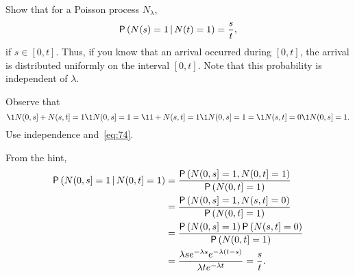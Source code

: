 \begin{extra}
Show that for a Poisson process $N_\lambda$, 
\begin{equation*}
\P{N(s) =1\given N(t)=1} = \frac s t,
\end{equation*}
if $s\in[0,t]$. Thus, if you know that an arrival occurred during $[0,t]$, the arrival is distributed
uniformly on the interval $[0,t]$. Note that this probability is independent of $\lambda$. 
\begin{hint}
 Observe that 
 \begin{equation*}
\1{N(0,s]+N(s,t]=1}\1{N(0,s]=1} = \1{1+N(s,t]=1}\1{N(0,s]=1}=\1{N(s,t]=0}\1{N(0,s]=1}.
 \end{equation*}
Use independence and~\cref{eq:74}.
\end{hint}
\begin{solution}
From the hint,
\begin{align*}
 \P{N(0,s] =1\given N(0,t]=1} 
&= \frac{\P{N(0,s] =1, N(0,t]=1}}{\P{N(0,t]=1}} \\
&= \frac{\P{N(0,s] =1, N(s,t]=0}}{\P{N(0,t]=1}} \\
&= \frac{\P{N(0,s] =1}\P{N(s,t]=0}}{\P{N(0,t]=1}} \\
&= \frac{\lambda s e^{-\lambda s} e^{-\lambda (t-s)}}{\lambda t e^{-\lambda t}} = \frac s t.
\end{align*}
\end{solution}
\end{extra}
 
